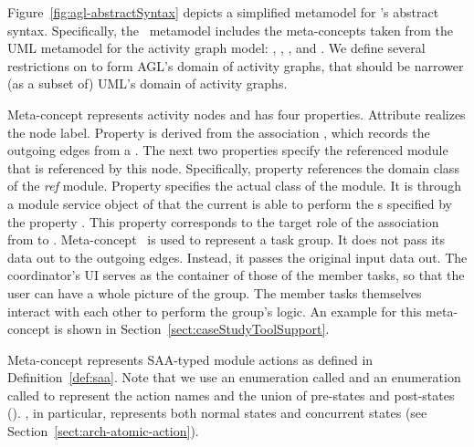 Figure~\ref{fig:agl-abstractSyntax} depicts a simplified metamodel for \agl's abstract syntax. %
%
%
Specifically, the \agl~metamodel includes the meta-concepts taken from the UML metamodel for the activity graph model: , , , and . We define several restrictions on  to form AGL's domain of activity graphs, that should be narrower (as a subset of) UML's domain of activity graphs.

Meta-concept  represents activity nodes and has four properties. Attribute  realizes the node label. 
Property  is derived from the association , which records the outgoing edges from a . The next two properties specify the referenced module that is referenced by this node. Specifically, property  references the domain class of the \textit{ref} module. 
%
Property  specifies the actual  class of the module. It is through a module service object of  that the current  is able to perform the s specified by the property . This property corresponds to the target role of the association from  to . Meta-concept~ is used to represent a task group. It does not pass its data out to the outgoing edges. Instead, it passes the original input data out. The coordinator's UI serves as the container of those of the member tasks, so that the user can have a whole picture of the group. The member tasks themselves interact with each other to perform the group's logic. An example for this meta-concept is shown in Section~\ref{sect:caseStudyToolSupport}.

Meta-concept  represents SAA-typed module actions as defined in Definition~\ref{def:saa}. Note that we use an enumeration called  and an enumeration called  to represent the action names and the union of pre-states and post-states (\resp). , in particular, represents both normal states and concurrent states (see Section~\ref{sect:arch-atomic-action}).

